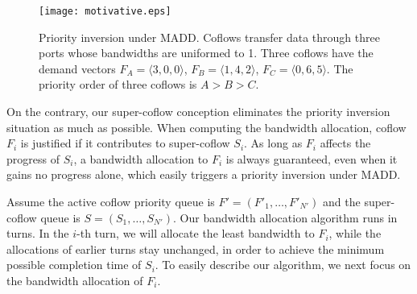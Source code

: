 \documentclass[10pt, conference, letterpaper]{IEEEtran}
\begin{document}
\begin{figure}
	\centering\texttt{[image: motivative.eps]}
	\caption{Priority inversion under MADD. Coflows transfer data through three ports whose bandwidths are uniformed to 1. Three coflows have the demand vectors $F_A=\langle 3,0,0\rangle$, $F_B=\langle 1,4,2\rangle$, $F_C=\langle 0,6,5\rangle$. The priority order of three coflows is $A > B > C$.}\label{motivative}
\end{figure}


On the contrary, our super-coflow conception eliminates the priority inversion situation as much as possible. When computing the bandwidth allocation, coflow $F_i$ is justified if it contributes to super-coflow $S_i$. As long as $F_i$ affects the progress of $S_i$, a bandwidth allocation to $F_i$ is always guaranteed, even when it gains no progress alone, which easily triggers a priority inversion under MADD.

Assume the active coflow priority queue is $F'=(F'_1,\dots,F'_{N'})$ and the super-coflow queue is $S = (S_1,\dots,S_{N'})$. Our bandwidth allocation algorithm runs in turns. In the $i$-th turn, we will allocate the least bandwidth to $F_i$, while the allocations of earlier turns stay unchanged,  in order to achieve the minimum possible completion time of $S_i$. To easily describe our algorithm, we next focus on the bandwidth allocation of $F_i$.
\end{document}
